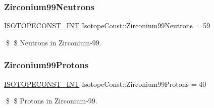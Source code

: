 \subsubsection{\texorpdfstring{Zirconium99\+Neutrons}{Zirconium99Neutrons}}
{\footnotesize\ttfamily \mbox{\hyperlink{group___isotope_const-_macros_ga5f18360b3e99483a35c32d789e62621c}{I\+S\+O\+T\+O\+P\+E\+C\+O\+N\+S\+T\+\_\+\+I\+NT}} Isotope\+Const\+::\+Zirconium99\+Neutrons = 59}

\$ \$ Neutrons in Zirconium-\/99. \mbox{\label{group___isotope_const-_zirconium-_zr99_gad077a684a585ad41fb36db051e92979f}} 
\subsubsection{\texorpdfstring{Zirconium99\+Protons}{Zirconium99Protons}}
{\footnotesize\ttfamily \mbox{\hyperlink{group___isotope_const-_macros_ga5f18360b3e99483a35c32d789e62621c}{I\+S\+O\+T\+O\+P\+E\+C\+O\+N\+S\+T\+\_\+\+I\+NT}} Isotope\+Const\+::\+Zirconium99\+Protons = 40}

\$ \$ Protons in Zirconium-\/99. 